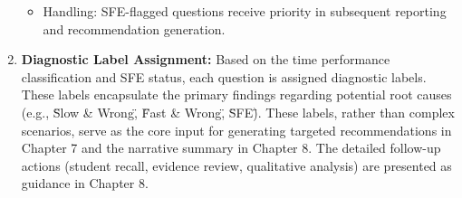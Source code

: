 \documentclass{article}
\begin{document}
\begin{enumerate}
\begin{itemize}
        \item Handling: SFE-flagged questions receive priority in subsequent reporting and recommendation generation.
    \end{itemize}
    \item \textbf{Diagnostic Label Assignment:} Based on the time performance classification and SFE status, each question is assigned diagnostic labels. These labels encapsulate the primary findings regarding potential root causes (e.g., \"Slow \& Wrong\", \"Fast \& Wrong\", \"SFE\"). These labels, rather than complex scenarios, serve as the core input for generating targeted recommendations in Chapter 7 and the narrative summary in Chapter 8. The detailed follow-up actions (student recall, evidence review, qualitative analysis) are presented as guidance in Chapter 8.
\end{enumerate}
\end{document}
